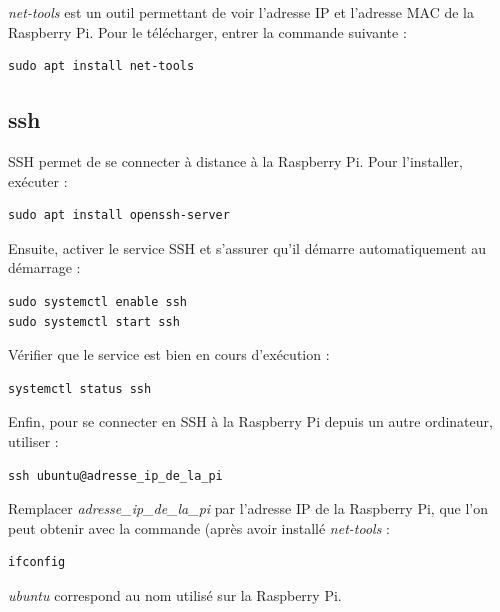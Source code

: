 \textit{net-tools} est un outil permettant de voir l'adresse IP et l'adresse MAC de la Raspberry Pi. Pour le télécharger, entrer la commande suivante : 
\begin{lstlisting}[style=commandstyle]
sudo apt install net-tools
\end{lstlisting}

\subsection{ssh}

\noindent SSH permet de se connecter à distance à la Raspberry Pi. Pour l'installer, exécuter :

\begin{lstlisting}[style=commandstyle]
sudo apt install openssh-server
\end{lstlisting}

\noindent Ensuite, activer le service SSH et s'assurer qu'il démarre automatiquement au démarrage :

\begin{lstlisting}[style=commandstyle]
sudo systemctl enable ssh
sudo systemctl start ssh
\end{lstlisting}

\noindent Vérifier que le service est bien en cours d'exécution :

\begin{lstlisting}[style=commandstyle]
systemctl status ssh
\end{lstlisting}

\noindent Enfin, pour se connecter en SSH à la Raspberry Pi depuis un autre ordinateur, utiliser :

\begin{lstlisting}[style=commandstyle]
ssh ubuntu@adresse_ip_de_la_pi
\end{lstlisting}

\noindent Remplacer \textit{adresse\_ip\_de\_la\_pi} par l'adresse IP de la Raspberry Pi, que l'on peut obtenir avec la commande (après avoir installé \textit{net-tools} :

\begin{lstlisting}[style=commandstyle]
ifconfig
\end{lstlisting}

\noindent \textit{ubuntu} correspond au nom utilisé sur la Raspberry Pi.




